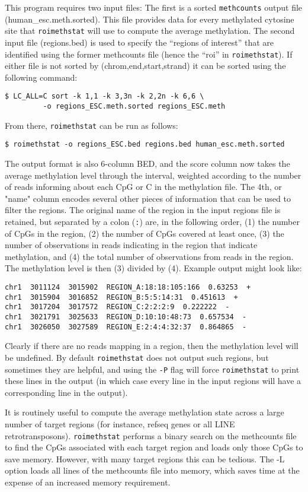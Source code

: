 \documentclass[10pt]{article}
\newcommand{\prog}[1]{\texttt{#1}}
\newcommand{\lit}[1]{\texttt{#1}}
\newcommand{\op}[1]{\texttt{#1}}
\begin{document}
{{This program requires two input files: The first is a sorted \prog{methcounts}
output file (human\_esc.meth.sorted). This file provides data for every
methylated cytosine site that \prog{roimethstat} will use to compute the
average methylation. The second input file (regions.bed) is used to specify
the ``regions of interest'' that are identified using the former methcounts
file (hence the ``roi'' in \prog{roimethstat}).
If either file is not sorted by (chrom,end,start,strand) it can be sorted using 
the following command:
\begin{verbatim}
$ LC_ALL=C sort -k 1,1 -k 3,3n -k 2,2n -k 6,6 \
         -o regions_ESC.meth.sorted regions_ESC.meth
\end{verbatim}
From there, \prog{roimethstat} can be run as follows:
\begin{verbatim}
$ roimethstat -o regions_ESC.bed regions.bed human_esc.meth.sorted
\end{verbatim}
The output format is also 6-column BED, and the score column now takes
the average methylation level through the interval, weighted according
to the number of reads informing about each CpG or C in the
methylation file. The 4th, or "name" column encodes several other
pieces of information that can be used to filter the regions. The
original name of the region in the input regions file is retained, but
separated by a colon (\lit{:}) are, in the following order, (1) the
number of CpGs in the region, (2) the number of CpGs covered at least
once, (3) the number of observations in reads indicating in the region
that indicate methylation, and (4) the total number of observations
from reads in the region. The methylation level is then (3) divided by
(4). Example output might look like:
\begin{verbatim}
chr1  3011124  3015902  REGION_A:18:18:105:166  0.63253  +
chr1  3015904  3016852  REGION_B:5:5:14:31  0.451613  +
chr1  3017204  3017572  REGION_C:2:2:2:9  0.222222  -
chr1  3021791  3025633  REGION_D:10:10:48:73  0.657534  -
chr1  3026050  3027589  REGION_E:2:4:4:32:37  0.864865  -
\end{verbatim}
Clearly if there are no reads mapping in a region, then the
methylation level will be undefined. By default \prog{roimethstat}
does not output such regions, but sometimes they are helpful, and
using the \op{-P} flag will force \prog{roimethstat} to print these
lines in the output (in which case every line in the input regions
will have a corresponding line in the output).

It is routinely useful to compute the average methylation state across a
large number of target regions (for instance, refseq genes or all LINE
retrotransposons). \prog{roimethstat} performs a binary search on the
methcounts file to find the CpGs associated with each target region and
loads only those CpGs to save memory. However, with many target regions
this can be tedious. The -L option loads all lines of the methcounts
file into memory, which saves time at the expense of an increased
memory requirement.


}}
\end{document}
